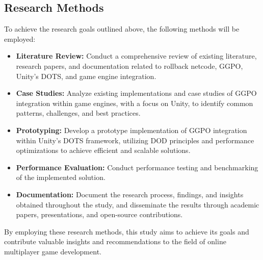 \subsection{Research Methods}

To achieve the research goals outlined above, the following methods will be employed:

\begin{itemize}
    \item \textbf{Literature Review:} Conduct a comprehensive review of existing literature, research papers, and documentation related to rollback netcode, GGPO,  Unity's DOTS, and game engine integration.
    
    \item \textbf{Case Studies:} Analyze existing implementations and case studies of GGPO integration within game engines, with a focus on Unity, to identify common patterns, challenges, and best practices.
    
    \item \textbf{Prototyping:} Develop a prototype implementation of GGPO  integration within Unity's DOTS framework, utilizing DOD principles and performance optimizations to achieve efficient and scalable solutions.
    
    \item \textbf{Performance Evaluation:} Conduct performance testing and benchmarking of the implemented solution.
    
    \item \textbf{Documentation:} Document the research process, findings, and insights obtained throughout the study, and disseminate the results through academic papers, presentations, and open-source contributions.
\end{itemize}

By employing these research methods, this study aims to achieve its goals and contribute valuable insights and recommendations to the field of online multiplayer game development.





